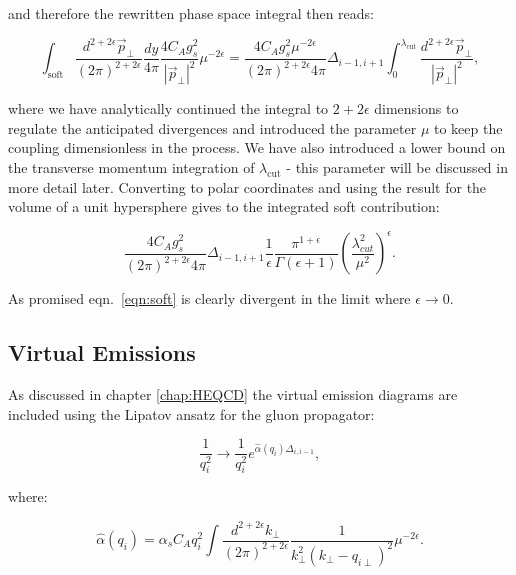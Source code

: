 			and therefore the rewritten phase space integral then reads:

			\begin{equation}
				\int_{\text{soft}}\frac{d^{2+2\epsilon}\vec{p}_{\perp}}{(2\pi)^{2+2\epsilon}}\frac{dy}{4\pi}\frac{4C_Ag_s^2}
					{|\vec{p}_\perp|^2}\mu^{-2\epsilon} = \frac{4C_Ag_s^2\mu^{-2\epsilon}}{(2\pi)^{2+2\epsilon}4\pi}
					\Delta_{i-1, i+1}\int_0^{\lambda_{\text{cut}}}\frac{d^{2+2\epsilon}\vec{p}_{\perp}}{|\vec{p}_\perp|^2},
			\end{equation}

			where we have analytically continued the integral to $2+2\epsilon$ dimensions to regulate the anticipated
			divergences and introduced the parameter $\mu$ to keep the coupling dimensionless in the process.
			We have also introduced a lower bound on the transverse momentum integration of $\lambda_{\text{cut}}$ -
			this parameter will be discussed in more detail later.
			Converting to polar coordinates and using the result for the volume of a unit hypersphere gives
			to the integrated soft contribution:

			\begin{equation}
				\frac{4C_Ag_s^2}{(2\pi)^{2+2\epsilon}4\pi}\Delta_{i-1, i+1}
				\frac{1}{\epsilon}\frac{\pi^{1+\epsilon}}
				{\Gamma(\epsilon+1)}\left(\frac{\lambda_{cut}^2}{\mu^2}\right)^\epsilon.
				\label{eqn:soft}
			\end{equation}

			As promised eqn.~\eqref{eqn:soft} is clearly divergent in the limit where $\epsilon\to0$.

	\subsection{Virtual Emissions}
		\label{sub:subsection_name}

		As discussed in chapter \ref{chap:HEQCD} the virtual emission diagrams are included
		using the Lipatov ansatz for the gluon propagator:

		\begin{equation}
			\frac{1}{q_i^2}\longrightarrow\frac{1}{q_i^2}e^{\hat{\alpha}(q_i)\Delta_{i,i-1}},
		\end{equation}

		where:

		\begin{equation}
			\hat{\alpha}(q_i) = \alpha_sC_Aq_i^2\int \frac{d^{2+2\epsilon}k_{\perp}}{(2\pi)^{2+2\epsilon}}
			\frac{1}{k^2_\perp(k_\perp - q_{i\perp})^2}\mu^{-2\epsilon}.
			\label{eqn:feynmanPs}
		\end{equation}

